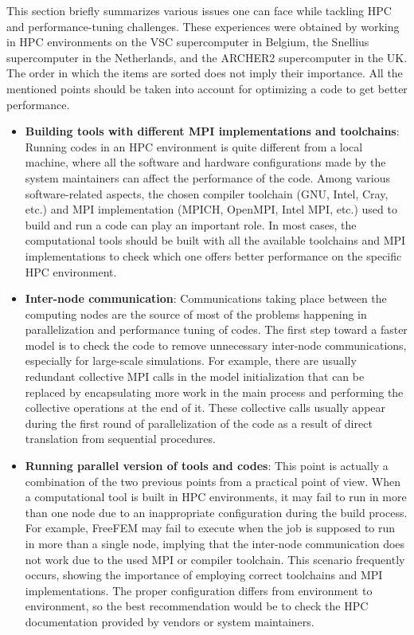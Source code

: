 This section briefly summarizes various issues one can face while tackling \gls{HPC} and performance-tuning challenges. These experiences were obtained by working in \gls{HPC} environments on the VSC supercomputer in Belgium, the Snellius supercomputer in the Netherlands, and the ARCHER2 supercomputer in the UK. The order in which the items are sorted does not imply their importance. All the mentioned points should be taken into account for optimizing a code to get better performance.

\begin{itemize}
\item
\textbf{Building tools with different \gls{MPI} implementations and toolchains}: Running codes in an \gls{HPC} environment is quite different from a local machine, where all the software and hardware configurations made by the system maintainers can affect the performance of the code. Among various software-related aspects, the chosen compiler toolchain (GNU, Intel, Cray, etc.) and \gls{MPI} implementation (MPICH, OpenMPI, Intel \gls{MPI}, etc.) used to build and run a code can play an important role. In most cases, the computational tools should be built with all the available toolchains and \gls{MPI} implementations to check which one offers better performance on the specific \gls{HPC} environment.
\item
\textbf{Inter-node communication}: Communications taking place between the computing nodes are the source of most of the problems happening in parallelization and performance tuning of codes. The first step toward a faster model is to check the code to remove unnecessary inter-node communications, especially for large-scale simulations. For example, there are usually redundant collective \gls{MPI} calls in the model initialization that can be replaced by encapsulating more work in the main process and performing the collective operations at the end of it. These collective calls usually appear during the first round of parallelization of the code as a result of direct translation from sequential procedures.
\item
\textbf{Running parallel version of tools and codes}: This point is actually a combination of the two previous points from a practical point of view. When a computational tool is built in \gls{HPC} environments, it may fail to run in more than one node due to an inappropriate configuration during the build process. For example, FreeFEM may fail to execute when the job is supposed to run in more than a single node, implying that the inter-node communication does not work due to the used \gls{MPI} or compiler toolchain. This scenario frequently occurs, showing the importance of employing correct toolchains and \gls{MPI} implementations. The proper configuration differs from environment to environment, so the best recommendation would be to check the \gls{HPC} documentation provided by vendors or system maintainers.

\end{itemize}
